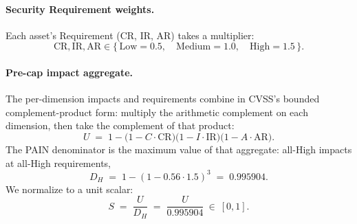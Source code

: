 \documentclass[11pt]{article}
\begin{document}
\paragraph{Security Requirement weights.}
Each asset's Requirement (CR, IR, AR) takes a multiplier:
\[
\mathrm{CR},\mathrm{IR},\mathrm{AR} \in \{\,\text{Low}=0.5,\quad \text{Medium}=1.0,\quad \text{High}=1.5\,\}.
\]

\paragraph{Pre-cap impact aggregate.}
The per-dimension impacts and requirements combine in CVSS's bounded
complement-product form: multiply the arithmetic complement on each dimension,
then take the complement of that product:
\begin{equation}
U \;=\; 1 - \big(1 - C\!\cdot\!\mathrm{CR}\big)
               \big(1 - I\!\cdot\!\mathrm{IR}\big)
               \big(1 - A\!\cdot\!\mathrm{AR}\big).
\label{eq:u}
\end{equation}
The PAIN denominator is the maximum value of that aggregate: all-High impacts at
all-High requirements,
\begin{equation}
D_H \;=\; 1-(1-0.56\!\cdot\!1.5)^3 \;=\; 0.995904.
\label{eq:dh}
\end{equation}
We normalize to a unit scalar:
\begin{equation}
S \;=\; \frac{U}{D_H} \;=\; \frac{U}{0.995904} \ \in\ [0,1].
\label{eq:s}
\end{equation}
\end{document}
